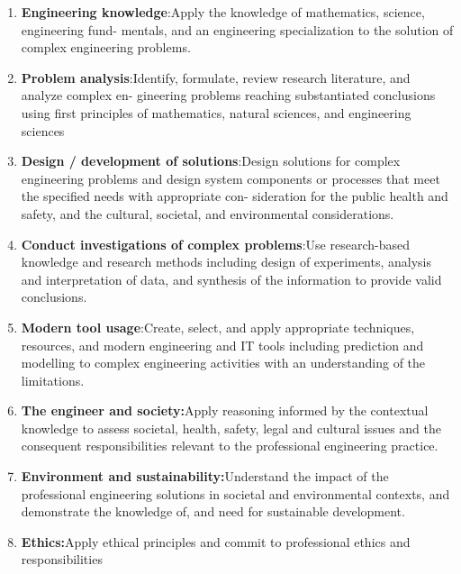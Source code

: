 \documentclass[10pt,a4paper]{report}
\begin{document}
\begin{center}
\begin{center}
\begin{enumerate}
\item \textbf{\large Engineering knowledge}\large:Apply the knowledge of mathematics, science, engineering
fund- mentals, and an engineering specialization to the solution of complex engineering
problems. ~
\vspace{0.5cm}
\item \textbf{\large Problem analysis}\large:Identify, formulate, review research literature, and analyze complex
en- gineering problems reaching substantiated conclusions using first principles of
mathematics, natural sciences, and engineering sciences ~
\vspace{0.5cm}
\item \textbf{\large Design / development of solutions}\large:Design solutions for complex engineering problems
and design system components or processes that meet the specified needs with
appropriate con- sideration for the public health and safety, and the cultural, societal, and
environmental considerations.~
\vspace{0.5cm}
\item \textbf{\large Conduct investigations of complex problems}\large:Use research-based knowledge and
research methods including design of experiments, analysis and interpretation of data, and
synthesis of the information to provide valid conclusions.~
\vspace{0.5cm}
\item \textbf{\large Modern tool usage}\large:Create, select, and apply appropriate techniques, resources, and
modern engineering and IT tools including prediction and modelling to complex
engineering activities with an understanding of the limitations.~
\vspace{0.5cm}
\item \textbf{\large The engineer and society:}\large Apply reasoning informed by the contextual knowledge to
assess societal, health, safety, legal and cultural issues and the consequent responsibilities
relevant to the professional engineering practice.~
\vspace{0.5cm}
\item \textbf{\large Environment and sustainability:}\large Understand the impact of the professional engineering
solutions in societal and environmental contexts, and demonstrate the knowledge of, and
need for sustainable development.~
\vspace{0.5cm}
\item \textbf{\large Ethics:}\large Apply ethical principles and commit to professional ethics and responsibilities

\end{enumerate}
\end{center}
\end{center}
\end{document}
